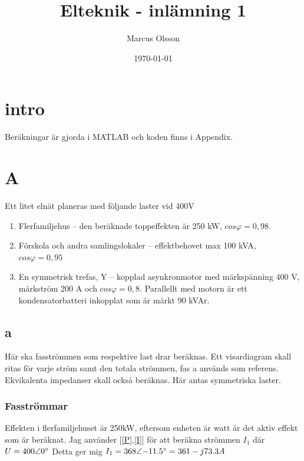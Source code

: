 \documentclass{article}
\title{Elteknik - inlämning 1} %
\author{
	\begin{tabular}{l r}
    Marcus Olsson \\
    \\
    \end{tabular}
    }
\date{\today} %
\begin{document}
\maketitle %
\tableofcontents
\clearpage
\section{intro}
Beräkningar är gjorda i MATLAB och koden finns i Appendix.

\section{A}
Ett litet elnät planeras med följande laster vid 400V

\begin{enumerate}
	\item Flerfamiljehus – den beräknade toppeffekten är 250 kW, $cos\varphi = 0,98$.
	\item Förskola och andra samlingslokaler – effektbehovet max 100 kVA, $cos\varphi = 0,95$
	\item En symmetrisk trefas, Y – kopplad asynkronmotor med märkspänning 400 V,
märkström 200 A och $cos\varphi = 0,8$. Parallellt med motorn är ett kondensatorbatteri
inkopplat som är märkt 90 kVAr.
\end{enumerate}

\subsection{a}
Här ska fasströmmen som respektive last drar beräknas.
Ett visardiagram skall ritas för varje ström samt den totala strömmen, fas a används som referens.
Ekvikalenta impedanser skall också beräknas.
Här antas symmetriska laster.

  \subsubsection{Fasströmmar}
  Effekten i flerfamiljehuset är 250kW, eftersom enheten är watt är det aktiv effekt som är beräknat.
  Jag använder [\ref{P},\ref{I}] för att beräkna strömmen $I_1$ där $U=400\angle{0\degree}$
  Detta ger mig $I_1=368\angle{-11.5\degree}=361-j73.3 A$
\end{document}
